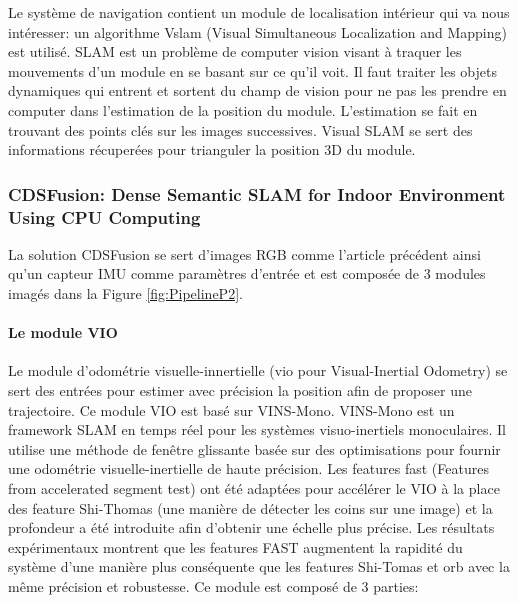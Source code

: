 \documentclass[11pt]{article}
\begin{document}
          Le système de navigation contient un module de localisation intérieur qui va nous intéresser: un algorithme V\acrshort{slam} (Visual Simultaneous 
          Localization and Mapping) est utilisé. SLAM est un problème de computer vision visant à traquer les mouvements d'un module en se basant
          sur ce qu'il voit. Il faut traiter les objets dynamiques qui entrent et sortent du champ de vision pour ne pas les prendre en computer
          dans l'estimation de la position du module. L'estimation se fait en trouvant des points clés sur les images successives.  Visual SLAM
          se sert des informations récuperées pour trianguler la position 3D du module. 
    
        \pagebreak

        \subsubsection{CDSFusion: Dense Semantic SLAM for Indoor Environment Using CPU Computing}
          La solution CDSFusion \cite{wangCDSFusionDenseSemantic2022} se sert d'images RGB comme l'article précédent ainsi qu'un capteur IMU comme paramètres d'entrée et est composée de 
          3 modules imagés dans la Figure \ref{fig:PipelineP2}.

          \paragraph{Le module VIO}
            Le module d'odométrie visuelle-innertielle (\acrshort{vio} pour Visual-Inertial Odometry) se sert des entrées pour estimer avec précision la position 
            afin de proposer une trajectoire. Ce module VIO est basé sur VINS-Mono. VINS-Mono est un framework SLAM en temps réel pour les 
            systèmes visuo-inertiels monoculaires. Il utilise une méthode de fenêtre glissante basée sur des optimisations pour fournir une odométrie 
            visuelle-inertielle de haute précision.
            Les features \acrshort{fast} (Features from accelerated segment test) ont été adaptées pour accélérer le VIO à 
            la place des feature Shi-Thomas (une manière de détecter les coins sur une image) et la profondeur a été introduite afin d'obtenir une échelle 
            plus précise. Les résultats expérimentaux montrent que les features FAST augmentent la rapidité du système d'une manière plus conséquente 
            que les features Shi-Tomas et \acrshort{orb} avec la même précision et robustesse. Ce module est composé de 3 parties:
\end{document}
